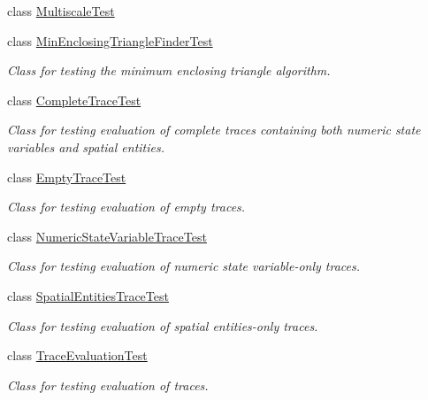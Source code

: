 \begin{DoxyCompactItemize}
\item 
class \hyperlink{classmultiscaletest_1_1MultiscaleTest}{\-Multiscale\-Test}
\item 
class \hyperlink{classmultiscaletest_1_1MinEnclosingTriangleFinderTest}{\-Min\-Enclosing\-Triangle\-Finder\-Test}
\begin{DoxyCompactList}\small\item\em \-Class for testing the minimum enclosing triangle algorithm. \end{DoxyCompactList}\item 
class \hyperlink{classmultiscaletest_1_1CompleteTraceTest}{\-Complete\-Trace\-Test}
\begin{DoxyCompactList}\small\item\em \-Class for testing evaluation of complete traces containing both numeric state variables and spatial entities. \end{DoxyCompactList}\item 
class \hyperlink{classmultiscaletest_1_1EmptyTraceTest}{\-Empty\-Trace\-Test}
\begin{DoxyCompactList}\small\item\em \-Class for testing evaluation of empty traces. \end{DoxyCompactList}\item 
class \hyperlink{classmultiscaletest_1_1NumericStateVariableTraceTest}{\-Numeric\-State\-Variable\-Trace\-Test}
\begin{DoxyCompactList}\small\item\em \-Class for testing evaluation of numeric state variable-\/only traces. \end{DoxyCompactList}\item 
class \hyperlink{classmultiscaletest_1_1SpatialEntitiesTraceTest}{\-Spatial\-Entities\-Trace\-Test}
\begin{DoxyCompactList}\small\item\em \-Class for testing evaluation of spatial entities-\/only traces. \end{DoxyCompactList}\item 
class \hyperlink{classmultiscaletest_1_1TraceEvaluationTest}{\-Trace\-Evaluation\-Test}
\begin{DoxyCompactList}\small\item\em \-Class for testing evaluation of traces. \end{DoxyCompactList}\end{DoxyCompactItemize}
